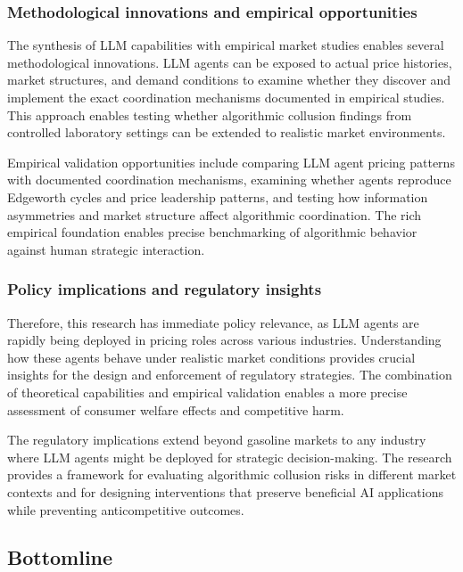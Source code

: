 \subsubsection*{Methodological innovations and empirical opportunities}

The synthesis of LLM capabilities with empirical market studies enables several methodological innovations. LLM agents can be exposed to actual price histories, market structures, and demand conditions to examine whether they discover and implement the exact coordination mechanisms documented in empirical studies. This approach enables testing whether algorithmic collusion findings from controlled laboratory settings can be extended to realistic market environments.

Empirical validation opportunities include comparing LLM agent pricing patterns with documented coordination mechanisms, examining whether agents reproduce Edgeworth cycles and price leadership patterns, and testing how information asymmetries and market structure affect algorithmic coordination. The rich empirical foundation enables precise benchmarking of algorithmic behavior against human strategic interaction.

\subsubsection*{Policy implications and regulatory insights}

Therefore, this research has immediate policy relevance, as LLM agents are rapidly being deployed in pricing roles across various industries. Understanding how these agents behave under realistic market conditions provides crucial insights for the design and enforcement of regulatory strategies. The combination of theoretical capabilities and empirical validation enables a more precise assessment of consumer welfare effects and competitive harm.

The regulatory implications extend beyond gasoline markets to any industry where LLM agents might be deployed for strategic decision-making. The research provides a framework for evaluating algorithmic collusion risks in different market contexts and for designing interventions that preserve beneficial AI applications while preventing anticompetitive outcomes.

\subsection{Bottomline}


